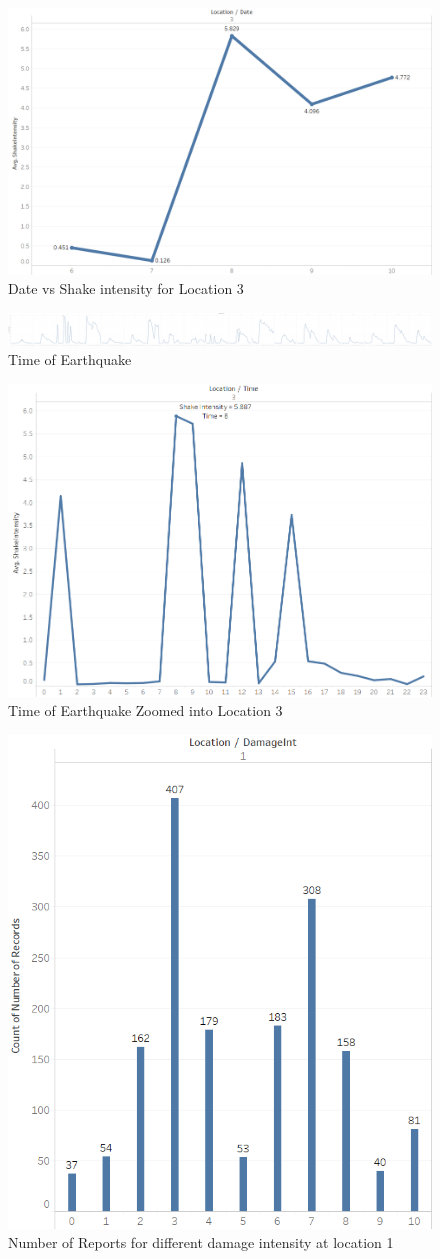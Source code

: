 \documentclass[12pt]{extarticle}
\begin{document}
\begin{figure}[H]
\centering
	\includegraphics[width=0.5\linewidth]{Images/DateZoom.png}
	\caption{Date vs Shake intensity for Location 3 }
	\label{fig:dateZoom}
\end{figure}

\begin{figure}[H]
\centering
	\includegraphics[width=\linewidth]{Images/time.png}
	\caption{Time of Earthquake}
	\label{fig:time}
\end{figure}

\begin{figure}[H]
\centering
	\includegraphics[width=0.5\linewidth]{Images/timeZoom.png}
	\caption{Time of Earthquake Zoomed into Location 3}
	\label{fig:timeZoom}
\end{figure}

\begin{figure}[H]
\centering
	\includegraphics[width=0.5\linewidth]{Images/Loc1Mode.png}
	\caption{Number of Reports for different damage intensity at location 1 }
	\label{fig:mode}
\end{figure}
\end{document}
